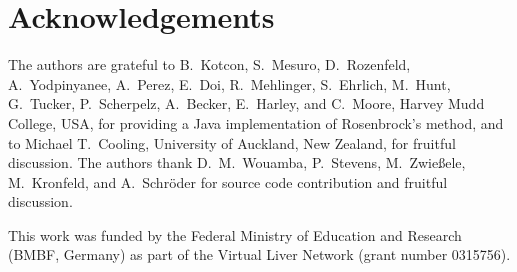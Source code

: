 \documentclass[10pt]{bmc_article}
\newenvironment{bmcformat}{\baselineskip20pt\sloppy\setboolean{publ}{false}}{\baselineskip20pt\sloppy}
\begin{document}
\begin{bmcformat}
\section*{Acknowledgements}
The authors are grateful to B.~Kotcon, S.~Mesuro, D.~Rozenfeld, A.~Yodpinyanee,
A.~Perez, E.~Doi, R.~Mehlinger, S.~Ehrlich, M.~Hunt, G.~Tucker, P.~Scherpelz,
A.~Becker, E.~Harley, and C.~Moore, Harvey Mudd College, USA, for providing a
Java implementation of Rosenbrock's method, and to Michael T.~Cooling,
University of Auckland, New Zealand, for fruitful discussion. The authors thank
D.~M.~Wouamba, P.~Stevens, M.~Zwie\ss{}ele, M.~Kronfeld, and A.~Schr\"oder for
source code contribution and fruitful discussion.

This work was funded by the Federal Ministry of Education and Research (BMBF,
Germany) as part of the Virtual Liver Network (grant number 0315756).
 

\newpage
{
   }     %





\end{bmcformat}
\end{document}
